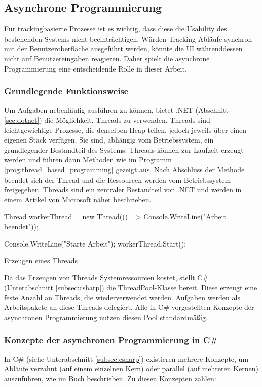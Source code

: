 \subsection{Asynchrone Programmierung}
\label{subsec:async}
Für trackingbasierte Prozesse ist es wichtig, dass diese die Usability des bestehenden Systems nicht beeinträchtigen. Würden Tracking-Abläufe synchron mit der Benutzeroberfläche ausgeführt werden, könnte die UI währenddessen nicht auf Benutzereingaben reagieren. Daher spielt die asynchrone Programmierung eine entscheidende Rolle in dieser Arbeit.

\subsubsection{Grundlegende Funktionsweise}
Um Aufgaben nebenläufig ausführen zu können, bietet .NET (Abschnitt \ref{sec:dotnet}) die Möglichkeit, Threads zu verwenden. Threads sind leichtgewichtige Prozesse, die denselben Heap teilen, jedoch jeweils über einen eigenen Stack verfügen. Sie sind, abhängig vom Betriebssystem, ein grundlegender Bestandteil des Systems. Threads können zur Laufzeit erzeugt werden und führen dann Methoden wie im Programm \ref{prog:thread_based_programming} gezeigt aus. Nach Abschluss der Methode beendet sich der Thread und die Ressourcen werden vom Betriebssystem freigegeben. Threads sind ein zentraler Bestandteil von .NET und werden in einem Artikel von Microsoft \cite{Microsoft_ThreadsAndThreading} näher beschrieben.

\begin{program}[H]
\begin{CsCode}
Thread workerThread = new Thread(() => Console.WriteLine("Arbeit beendet"));

Console.WriteLine("Starte Arbeit");
workerThread.Start();
\end{CsCode}
\caption{Erzeugen eines Threads}
\label{prog:thread_based_programming}
\end{program}

Da das Erzeugen von Threads Systemressourcen kostet, stellt C\# (Unterabschnitt \ref{subsec:csharp}) die ThreadPool-Klasse bereit. Diese erzeugt eine feste Anzahl an Threads, die wiederverwendet werden. Aufgaben werden als Arbeitspakete an diese Threads delegiert. Alle in C\# vorgestellten Konzepte der asynchronen Programmierung nutzen diesen Pool standardmäßig.

\subsubsection{Konzepte der asynchronen Programmierung in C\#}
In C\# (siehe Unterabschnitt \ref{subsec:csharp}) existieren mehrere Konzepte, um Abläufe verzahnt (auf einem einzelnen Kern) oder parallel (auf mehreren Kernen) auszuführen, wie im Buch \cite{sarcar2004design} beschrieben. Zu diesen Konzepten zählen:


